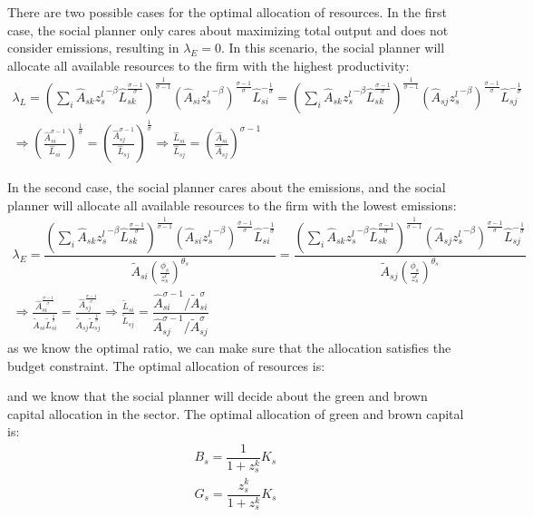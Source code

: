 There are two possible cases for the optimal allocation of resources. In the first case, the social planner only cares about maximizing total output and does not consider emissions, resulting in $\lambda_E = 0$. In this scenario, the social planner will allocate all available resources to the firm with the highest productivity:
\begin{gather*}
    \lambda_L = \left(
        \sum_i \hat{A}_{sk} {z_{s}^l}^{-\beta}\hat{L}_{sk}^{\frac{\sigma-1}{\sigma}}
    \right)^{\frac{1}{\sigma-1}}(\hat{A}_{si}{z_{s}^l}^{-\beta})^{\frac{\sigma-1}{\sigma}}\hat{L}_{si}^{-\frac{1}{\sigma}} = \left(
        \sum_i \hat{A}_{sk} {z_{s}^l}^{-\beta}\hat{L}_{sk}^{\frac{\sigma-1}{\sigma}}
    \right)^{\frac{1}{\sigma-1}}(\hat{A}_{sj}{z_{s}^l}^{-\beta})^{\frac{\sigma-1}{\sigma}}\hat{L}_{sj}^{-\frac{1}{\sigma}}\\
    \Rightarrow (\frac{\hat{A}_{si}^{\sigma-1}}{\hat{L}_{si}})^{\frac{1}{\sigma}} = (\frac{\hat{A}_{sj}^{\sigma-1}}{\hat{L}_{sj}})^{\frac{1}{\sigma}} \Rightarrow \frac{\hat{L}_{si}}{\hat{L}_{sj}} = \left(
        \frac{\hat{A}_{si}}{\hat{A}_{sj}}
    \right)^{\sigma-1}
\end{gather*}
 
In the second case, the social planner cares about the emissions, and the social planner will allocate all available resources to the firm with the lowest emissions:
\begin{gather*}
    \lambda_E = \dfrac{\left(
        \sum_i \hat{A}_{sk} {z_{s}^l}^{-\beta}\hat{L}_{sk}^{\frac{\sigma-1}{\sigma}}
    \right)^{\frac{1}{\sigma-1}}(\hat{A}_{si}{z_{s}^l}^{-\beta})^{\frac{\sigma-1}{\sigma}}\hat{L}_{si}^{-\frac{1}{\sigma}}}{
        \tilde{A}_{si}(\frac{\phi_{s}}{z^{l}_{s}})^{\theta_s}
    } = \dfrac{\left(
        \sum_i \hat{A}_{sk} {z_{s}^l}^{-\beta}\hat{L}_{sk}^{\frac{\sigma-1}{\sigma}}
    \right)^{\frac{1}{\sigma-1}}(\hat{A}_{sj}{z_{s}^l}^{-\beta})^{\frac{\sigma-1}{\sigma}}\hat{L}_{sj}^{-\frac{1}{\sigma}}}{
        \tilde{A}_{sj}(\frac{\phi_{s}}{z^{l}_{s}})^{\theta_s}
    }\\
    \Rightarrow \frac{\hat{A}_{si}^{\frac{\sigma-1}{\sigma}}}{\tilde{A}_{si}\tilde{L}_{si}^{\frac{1}{\sigma}}} = \frac{\hat{A}_{sj}^{\frac{\sigma-1}{\sigma}}}{\tilde{A}_{sj}\tilde{L}_{sj}^{\frac{1}{\sigma}}} \Rightarrow \frac{\tilde{L}_{si}}{\tilde{L}_{sj}} = \dfrac{\hat{A}_{si}^{\sigma-1}/\tilde{A}_{si}^{\sigma}}{\hat{A}_{sj}^{\sigma-1}/\tilde{A}_{sj}^{\sigma}}
\end{gather*}
as we know the optimal ratio, we can make sure that the allocation satisfies the budget constraint. The optimal allocation of resources is:

and we know that the social planner will decide about the green and brown capital allocation in the sector. The optimal allocation of green and brown capital is:
\begin{gather*}
    B_s = \dfrac{1}{1 + z_s^k} K_s \\ 
    G_s = \dfrac{z_s^k}{1 + z_s^k} K_s
\end{gather*}



